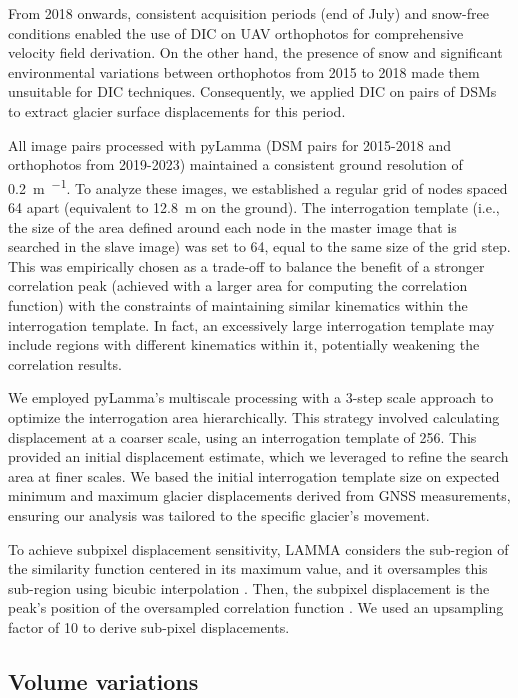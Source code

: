 From 2018 onwards, consistent acquisition periods (end of July) and snow-free conditions enabled the use of DIC on UAV orthophotos for comprehensive velocity field derivation.
On the other hand, the presence of snow and significant environmental variations between orthophotos from 2015 to 2018 made them unsuitable for DIC techniques.
Consequently, we applied DIC on pairs of DSMs \citep{Gindraux2019} to extract glacier surface displacements for this period.

All image pairs processed with pyLamma (DSM pairs for 2015-2018 and orthophotos from 2019-2023) maintained a consistent ground resolution of \SI{0.2}{\meter\per\pixel}. 
To analyze these images, we established a regular grid of nodes spaced \SI{64}{\pixel} apart (equivalent to \SI{12.8}{\meter} on the ground).
The interrogation template (i.e., the size of the area defined around each node in the master image that is searched in the slave image)
was set to \SI{64}{\pixel}, equal to the same size of the grid step.
This was empirically chosen as a trade-off to balance the benefit of a stronger correlation peak (achieved with a larger area for computing the correlation function) with the constraints of maintaining similar kinematics within the interrogation template.
In fact, an excessively large interrogation template may include regions with different kinematics within it, potentially weakening the correlation results. 

We employed pyLamma's multiscale processing with a 3-step scale approach to optimize the interrogation area hierarchically.  
This strategy involved calculating displacement at a coarser scale, using an interrogation template of \SI{256}{\pixel}. 
This provided an initial displacement estimate, which we leveraged to refine the search area at finer scales.  
We based the initial interrogation template size on expected minimum and maximum glacier displacements derived from GNSS measurements, ensuring our analysis was tailored to the specific glacier's movement.

To achieve subpixel displacement sensitivity, LAMMA considers the sub-region of the similarity function centered in its maximum value, and it oversamples this sub-region using bicubic interpolation \citep{Dematteis2022}.
Then, the subpixel displacement is the peak's position of the oversampled correlation function \citep{Debella_Gilo2011}.
We used an upsampling factor of 10 to derive sub-pixel displacements. 

\subsection{Volume variations}\label{sec:3:method_volumes}

